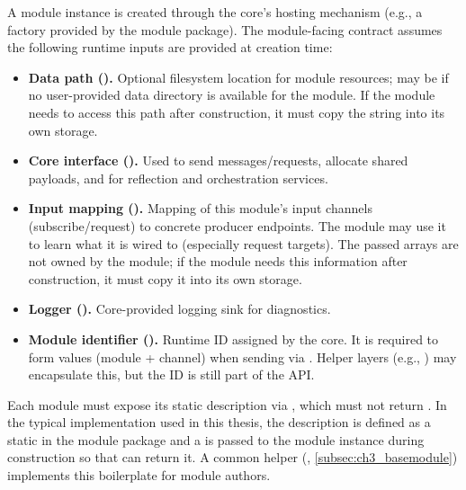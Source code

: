 A module instance is created through the core's hosting mechanism (e.g., a factory provided by the module package). The module-facing contract assumes the following runtime inputs are provided at creation time:
\begin{itemize}
    \item \textbf{Data path ().} Optional filesystem location for module resources; may be  if no user-provided data directory is available for the module. If the module needs to access this path after construction, it must copy the string into its own storage.
    \item \textbf{Core interface ().} Used to send messages/requests, allocate shared payloads, and for reflection and orchestration services.
    \item \textbf{Input mapping ().} Mapping of this module's input channels (subscribe/request) to concrete producer endpoints. The module may use it to learn what it is wired to (especially request targets). The passed arrays are not owned by the module; if the module needs this information after construction, it must copy it into its own storage.
    \item \textbf{Logger ().} Core-provided logging sink for diagnostics.
    \item \textbf{Module identifier ().} Runtime ID assigned by the core. It is required to form  values (module + channel) when sending via . Helper layers (e.g., ) may encapsulate this, but the ID is still part of the API.
\end{itemize}
Each module must expose its static description via , which must not return . In the typical implementation used in this thesis, the description is defined as a static  in the module package and a  is passed to the module instance during construction so that  can return it. A common helper (, \autoref{subsec:ch3_basemodule}) implements this boilerplate for module authors.

